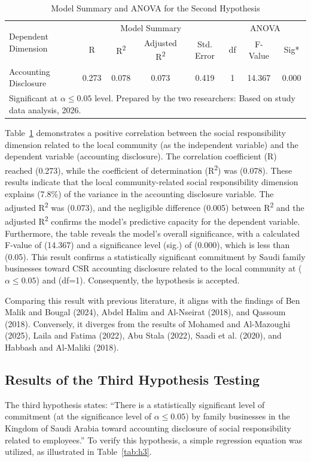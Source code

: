 \documentclass{NSP1}
\begin{document}
\begin{table}[!ht]
\centering
\caption{Model Summary and ANOVA for the Second Hypothesis}
\label{tab:h2}
\begin{tabular}{lccccccc}
\hline
\multirow{2}{*}{Dependent Dimension} & \multicolumn{4}{c}{Model Summary} & \multicolumn{3}{c}{ANOVA} \\
 & R & R\textsuperscript{2} & Adjusted R\textsuperscript{2} & Std. Error & df & F-Value & Sig* \\
\hline
Accounting Disclosure & 0.273 & 0.078 & 0.073 & 0.419 & 1 & 14.367 & 0.000 \\
\hline
\multicolumn{8}{l}{\footnotesize *Significant at $\alpha \le 0.05$ level. Prepared by the two researchers: Based on study data analysis, 2026.} \\
\end{tabular}
\end{table}

Table~\ref{tab:h2} demonstrates a positive correlation between the social responsibility dimension related to the local community (as the independent variable) and the dependent variable (accounting disclosure). The correlation coefficient (R) reached (0.273), while the coefficient of determination (R\textsuperscript{2}) was (0.078). These results indicate that the local community-related social responsibility dimension explains (7.8\%) of the variance in the accounting disclosure variable. The adjusted R\textsuperscript{2} was (0.073), and the negligible difference (0.005) between R\textsuperscript{2} and the adjusted R\textsuperscript{2} confirms the model's predictive capacity for the dependent variable. Furthermore, the table reveals the model's overall significance, with a calculated F-value of (14.367) and a significance level (sig.) of (0.000), which is less than (0.05). This result confirms a statistically significant commitment by Saudi family businesses toward CSR accounting disclosure related to the local community at ($\alpha \le 0.05$) and (df=1). Consequently, the hypothesis is accepted.

Comparing this result with previous literature, it aligns with the findings of Ben Malik and Bougal (2024), Abdel Halim and Al-Nseirat (2018), and Qassoum (2018). Conversely, it diverges from the results of Mohamed and Al-Mazoughi (2025), Laila and Fatima (2022), Abu Stala (2022), Saadi et al. (2020), and Habbash and Al-Maliki (2018).

\subsection{Results of the Third Hypothesis Testing}
The third hypothesis states: ``There is a statistically significant level of commitment (at the significance level of $\alpha \le 0.05$) by family businesses in the Kingdom of Saudi Arabia toward accounting disclosure of social responsibility related to employees.'' To verify this hypothesis, a simple regression equation was utilized, as illustrated in Table~\ref{tab:h3}.
\end{document}
